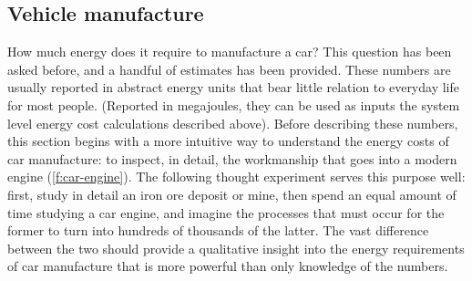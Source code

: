 \documentclass[a4paper, 11pt, twoside]{Thesis}
\begin{document}
\subsection{Vehicle manufacture} 
How much energy does it require to manufacture a car? This question has been
asked before, and a handful of estimates has been provided. These numbers
are usually reported in abstract energy
units that bear little relation to everyday life for most people. (Reported in
megajoules, they can be used as inputs the system level energy cost
calculations described above).
Before describing these numbers, this section begins with a more intuitive
way to understand the energy costs
of car manufacture: to inspect, in detail, the workmanship that goes into a
modern engine
(\cref{f:car-engine}). The following thought experiment serves this purpose
well: first, study in detail an iron ore
deposit or mine, then spend an equal amount of time studying a car
engine, and imagine the processes that must occur for the former to
turn into hundreds of thousands of the latter. The vast difference between the two
should provide a qualitative insight into the energy requirements of car
manufacture that is more powerful than only knowledge of the numbers.
\end{document}
